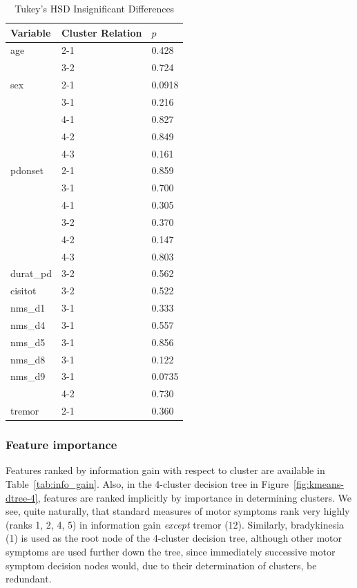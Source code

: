 \documentclass[10pt]{article}
\begin{document}
\begin{multicols}{2}
\begin{table}[H]
  \centering
  \begin{tabular}{l|l|l}
  Variable & Cluster Relation & $p$ \\
  \hline
age & 2-1 & 0.428 \\
    & 3-2 & 0.724 \\
    \hline
sex & 2-1 & 0.0918 \\
    & 3-1 & 0.216 \\
    & 4-1 & 0.827 \\
    & 4-2 & 0.849 \\
    & 4-3 & 0.161 \\
    \hline
pdonset & 2-1 & 0.859 \\
        & 3-1 & 0.700 \\
        & 4-1 & 0.305 \\
        & 3-2 & 0.370 \\
        & 4-2 & 0.147 \\
        & 4-3 & 0.803 \\
\hline
durat\_pd & 3-2 & 0.562 \\
\hline
cisitot & 3-2 & 0.522 \\
\hline
nms\_d1 & 3-1 & 0.333 \\
\hline
nms\_d4 & 3-1 & 0.557 \\
\hline
nms\_d5 & 3-1 & 0.856 \\
\hline
nms\_d8 & 3-1 & 0.122 \\
\hline
nms\_d9 & 3-1 & 0.0735 \\
       & 4-2 & 0.730 \\
\hline
tremor & 2-1 & 0.360 \\
  \end{tabular}
  \caption{Tukey's HSD Insignificant Differences}
  \label{tab:tukeyhsd}
\end{table}

\subsubsection{Feature importance}
\label{feature-importance}

Features ranked by information gain with respect to cluster are available in
Table~\ref{tab:info_gain}. Also, in the 4-cluster decision tree in
Figure~\ref{fig:kmeans-dtree-4}, features are ranked implicitly by importance
in determining clusters. We see, quite naturally, that standard measures of
motor symptoms rank very highly (ranks 1, 2, 4, 5) in information gain \emph{except}
tremor (12). Similarly, bradykinesia (1) is used as the root node of the
4-cluster decision tree, although other motor symptoms are used further down
the tree, since immediately successive motor symptom decision nodes would, due
to their determination of clusters, be redundant.


\end{multicols}
\end{document}
